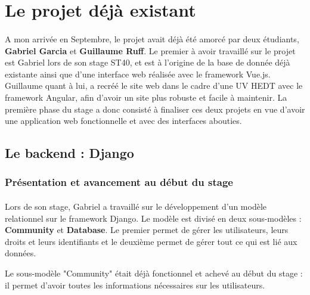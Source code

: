 \section{Le projet déjà existant}
\paragraph{} \hspace{10mm}
A mon arrivée en Septembre, le projet avait déjà été amorcé par deux étudiants, \textbf{Gabriel Garcia} et \textbf{Guillaume Ruff}. Le premier à avoir travaillé sur le projet est Gabriel lors de son stage ST40, et est à l'origine de la base de donnée déjà existante ainsi que d'une interface web réalisée avec le framework Vue.js. Guillaume quant à lui, a recréé le site web dans le cadre d'une UV HEDT avec le framework Angular, afin d'avoir un site plus robuste et facile à maintenir.
La première phase du stage a donc consisté à finaliser ces deux projets en vue d'avoir une application web fonctionnelle et avec des interfaces abouties.

\subsection{Le backend : Django}

\setcounter{secnumdepth}{3}
\subsubsection{Présentation et avancement au début du stage}
\paragraph{} \hspace{10mm}
Lors de son stage, Gabriel a travaillé sur le développement d'un modèle relationnel sur le framework Django. Le modèle est divisé en deux sous-modèles : \textbf{Community} et \textbf{Database}. Le premier permet de gérer les utilisateurs, leurs droits et leurs identifiants et le deuxième permet de gérer tout ce qui est lié aux données. 

Le sous-modèle "Community" était déjà fonctionnel et achevé au début du stage : il permet d'avoir toutes les informations nécessaires sur les utilisateurs.

